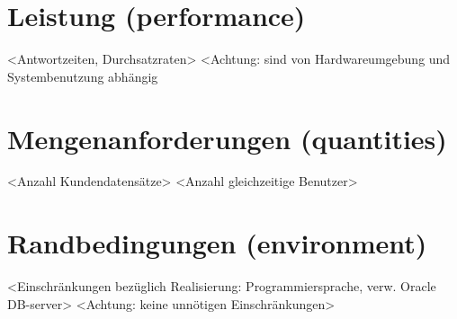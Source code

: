 	\section{Leistung (performance)}
	<Antwortzeiten, Durchsatzraten>
	<Achtung: sind von Hardwareumgebung und Systembenutzung abhängig
	\section{Mengenanforderungen (quantities)}
	<Anzahl Kundendatensätze>
	<Anzahl gleichzeitige Benutzer>
		
	\section{Randbedingungen (environment)}
	<Einschränkungen bezüglich Realisierung: Programmiersprache, verw. Oracle DB-server>
	<Achtung: keine unnötigen Einschränkungen>

	
